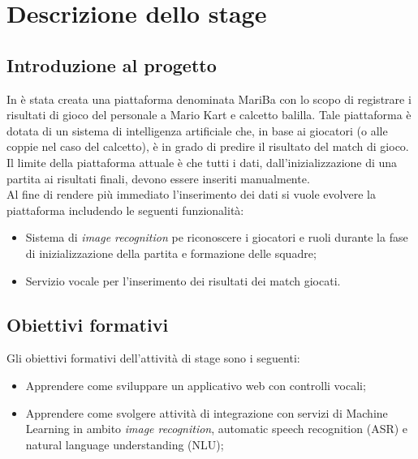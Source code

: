 
\chapter{Descrizione dello stage}
\label{cap:descrizione-stage}

\section{Introduzione al progetto}
In \azienda è stata creata una piattaforma denominata MariBa con lo scopo di registrare i risultati di gioco del personale a Mario Kart e calcetto balilla. Tale piattaforma è dotata di un sistema di intelligenza artificiale che, in base ai giocatori (o alle coppie nel caso del calcetto), è in grado di predire il risultato del match di gioco. Il limite della
piattaforma attuale è che tutti i dati, dall'inizializzazione di una partita ai risultati finali, devono essere inseriti
manualmente. \\

Al fine di rendere più immediato l'inserimento dei dati si vuole evolvere la piattaforma includendo le seguenti funzionalità:
\begin{itemize}
	\item Sistema di \emph{image recognition} pe riconoscere i giocatori e ruoli durante la fase di inizializzazione della partita
	e formazione delle squadre;
	\item Servizio vocale per l'inserimento dei risultati dei match giocati.
\end{itemize}


\section{Obiettivi formativi}
	Gli obiettivi formativi dell'attività di stage sono i seguenti:
	\begin{itemize}
		\item Apprendere come sviluppare un applicativo web con controlli vocali;
		\item Apprendere come svolgere attività di integrazione con servizi di Machine Learning in ambito \emph{image recognition}, \gls{automatic speech recognition} (ASR) e \gls{natural language understanding} (NLU);
	\end{itemize}

